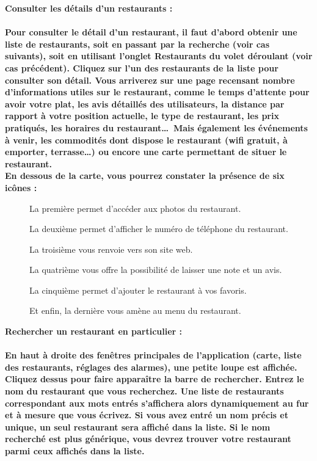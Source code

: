 \begin{description}
    \item \bf{Consulter les détails d'un restaurants :} \\ \\
        Pour consulter le détail d'un restaurant, il faut d'abord obtenir une liste de restaurants, soit en passant par la recherche (voir cas suivants), soit en utilisant l'onglet \og{}Restaurants\fg{} du volet déroulant (voir cas précédent). Cliquez sur l'un des restaurants de la liste pour consulter son détail. Vous arriverez sur une page recensant nombre d'informations utiles sur le restaurant, comme le temps d’attente pour avoir votre plat, les avis détaillés des utilisateurs, la distance par rapport à votre position actuelle, le type de restaurant, les prix pratiqués, les horaires du restaurant\dots~Mais également les événements à venir, les commodités dont dispose le restaurant (wifi gratuit, à emporter, terrasse\dots) ou encore une carte permettant de situer le restaurant. \\
        En dessous de la carte, vous pourrez constater la présence de six icônes : \\
            \begin{description}
                \item[\textbullet] La première permet d’accéder aux photos du restaurant. 
                \item[\textbullet] La deuxième permet d’afficher le numéro de téléphone du restaurant.
                \item[\textbullet] La troisième vous renvoie vers son site web. 
                \item[\textbullet] La quatrième vous offre la possibilité de laisser une note et un avis. 
                \item[\textbullet] La cinquième permet d’ajouter le restaurant à vos favoris. 
                \item[\textbullet] Et enfin, la dernière vous amène au menu du restaurant. \\
            \end{description}

    \item \bf{Rechercher un restaurant en particulier :} \\ \\
        En haut à droite des fenêtres principales de l'application (carte, liste des restaurants, réglages des alarmes), une petite loupe est affichée. Cliquez dessus pour faire apparaître la barre de rechercher. Entrez le nom du restaurant que vous recherchez. Une liste de restaurants correspondant aux mots entrés s'affichera alors dynamiquement au fur et à mesure que vous écrivez. Si vous avez entré un nom précis et unique, un seul restaurant sera affiché dans la liste. Si le nom recherché est plus générique, vous devrez trouver votre restaurant parmi ceux affichés dans la liste. \\
        

\end{description}
